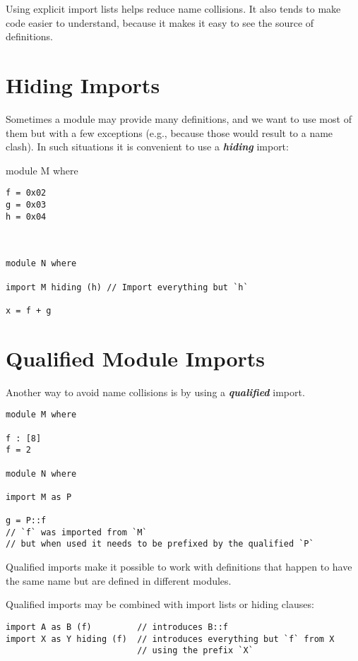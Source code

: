 Using explicit import lists helps reduce name collisions. It also tends
to make code easier to understand, because it makes it easy to see the
source of definitions.

\hypertarget{hiding-imports}{%
\section{Hiding Imports}\label{hiding-imports}}

Sometimes a module may provide many definitions, and we want to use most
of them but with a few exceptions (e.g., because those would result to a
name clash). In such situations it is convenient to use a
\textbf{\emph{hiding}} import:

module M where

\begin{verbatim}
f = 0x02
g = 0x03
h = 0x04



module N where

import M hiding (h) // Import everything but `h`

x = f + g
\end{verbatim}

\hypertarget{qualified-module-imports}{%
\section{Qualified Module Imports}\label{qualified-module-imports}}

Another way to avoid name collisions is by using a
\textbf{\emph{qualified}} import.

\begin{verbatim}
module M where

f : [8]
f = 2

module N where

import M as P

g = P::f
// `f` was imported from `M`
// but when used it needs to be prefixed by the qualified `P`
\end{verbatim}

Qualified imports make it possible to work with definitions that happen
to have the same name but are defined in different modules.

Qualified imports may be combined with import lists or hiding clauses:

\begin{verbatim}
import A as B (f)         // introduces B::f
import X as Y hiding (f)  // introduces everything but `f` from X
                          // using the prefix `X`
\end{verbatim}

